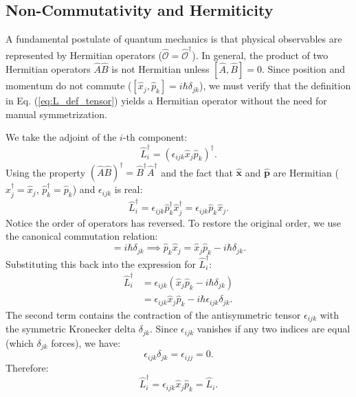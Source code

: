 \subsection{Non-Commutativity and Hermiticity}

A fundamental postulate of quantum mechanics is that physical observables are represented by Hermitian operators ($ \hat{\mathcal{O}} = \hat{\mathcal{O}}^\dagger $). In general, the product of two Hermitian operators $\hat{A}\hat{B}$ is not Hermitian unless $[\hat{A}, \hat{B}] = 0$. Since position and momentum do not commute ($[\hat{x}_j, \hat{p}_k] = i\hbar \delta_{jk}$), we must verify that the definition in Eq. (\ref{eq:L_def_tensor}) yields a Hermitian operator without the need for manual symmetrization.

We take the adjoint of the $i$-th component:
\begin{equation}
    \hat{L}_i^\dagger = (\epsilon_{ijk} \hat{x}_j \hat{p}_k)^\dagger.
\end{equation}
Using the property $(\hat{A}\hat{B})^\dagger = \hat{B}^\dagger \hat{A}^\dagger$ and the fact that $\hat{\mathbf{x}}$ and $\hat{\mathbf{p}}$ are Hermitian ($\hat{x}_j^\dagger = \hat{x}_j$, $\hat{p}_k^\dagger = \hat{p}_k$) and $\epsilon_{ijk}$ is real:
\begin{equation}
    \hat{L}_i^\dagger = \epsilon_{ijk} \hat{p}_k^\dagger \hat{x}_j^\dagger = \epsilon_{ijk} \hat{p}_k \hat{x}_j.
\end{equation}
Notice the order of operators has reversed. To restore the original order, we use the canonical commutation relation:
\begin{equation}
    [\hat{x}_j, \hat{p}_k] = i\hbar \delta_{jk} \implies \hat{p}_k \hat{x}_j = \hat{x}_j \hat{p}_k - i\hbar \delta_{jk}.
\end{equation}
Substituting this back into the expression for $\hat{L}_i^\dagger$:
\begin{align}
    \hat{L}_i^\dagger &= \epsilon_{ijk} (\hat{x}_j \hat{p}_k - i\hbar \delta_{jk}) \\
    &= \epsilon_{ijk} \hat{x}_j \hat{p}_k - i\hbar \epsilon_{ijk} \delta_{jk}.
\end{align}
The second term contains the contraction of the antisymmetric tensor $\epsilon_{ijk}$ with the symmetric Kronecker delta $\delta_{jk}$. Since $\epsilon_{ijk}$ vanishes if any two indices are equal (which $\delta_{jk}$ forces), we have:
\begin{equation}
    \epsilon_{ijk} \delta_{jk} = \epsilon_{ijj} = 0.
\end{equation}
Therefore:
\begin{equation}
    \hat{L}_i^\dagger = \epsilon_{ijk} \hat{x}_j \hat{p}_k = \hat{L}_i.
\end{equation}

